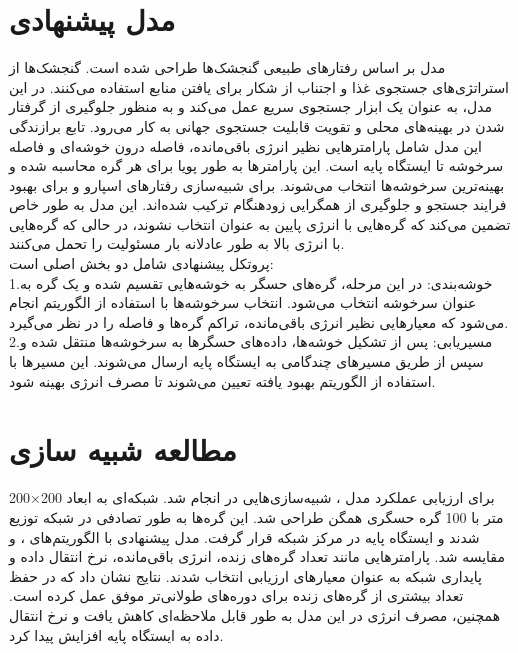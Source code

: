 \documentclass[11.5pt, onecolumn, a4paper]{article}
\begin{document}
\section{مدل پیشنهادی}
\hspace*{2em}مدل  بر اساس رفتارهای طبیعی  گنجشک‌ها طراحی شده است. گنجشک‌ها از استراتژی‌های جستجوی غذا و اجتناب از شکار برای یافتن منابع استفاده می‌کنند. در این مدل،  به عنوان یک ابزار جستجوی سریع عمل می‌کند و  به منظور جلوگیری از گرفتار شدن در بهینه‌های محلی و تقویت قابلیت جستجوی جهانی به کار می‌رود. تابع برازندگی این مدل شامل پارامترهایی نظیر انرژی باقی‌مانده، فاصله درون خوشه‌ای و فاصله سرخوشه تا ایستگاه پایه است. این پارامترها به طور پویا برای هر گره محاسبه شده و بهینه‌ترین سرخوشه‌ها انتخاب می‌شوند.  برای شبیه‌سازی رفتارهای اسپارو و  برای بهبود فرایند جستجو و جلوگیری از همگرایی زودهنگام ترکیب شده‌اند. این مدل به طور خاص تضمین می‌کند که گره‌هایی با انرژی پایین به عنوان  انتخاب نشوند، در حالی که گره‌هایی با انرژی بالا به طور عادلانه بار مسئولیت را تحمل می‌کنند.\\
پروتکل پیشنهادی شامل دو بخش اصلی است:\\
\hspace*{1em}1.خوشه‌بندی: در این مرحله، گره‌های حسگر به خوشه‌هایی تقسیم شده و یک گره به عنوان سرخوشه انتخاب می‌شود. انتخاب سرخوشه‌ها با استفاده از الگوریتم  انجام می‌شود که معیارهایی نظیر انرژی باقی‌مانده، تراکم گره‌ها و فاصله را در نظر می‌گیرد.\\
\hspace*{1em}2.مسیریابی: پس از تشکیل خوشه‌ها، داده‌های حسگرها به سرخوشه‌ها منتقل شده و سپس از طریق مسیرهای چندگامی به ایستگاه پایه ارسال می‌شوند. این مسیرها با استفاده از الگوریتم بهبود یافته  تعیین می‌شوند تا مصرف انرژی بهینه شود.


\section{مطالعه شبیه سازی}
\hspace*{1em}برای ارزیابی عملکرد مدل ، شبیه‌سازی‌هایی در    انجام شد. شبکه‌ای به ابعاد 200×200 متر با 100 گره حسگری همگن طراحی شد. این گره‌ها به طور تصادفی در شبکه توزیع شدند و ایستگاه پایه در مرکز شبکه قرار گرفت. مدل پیشنهادی با الگوریتم‌های ،  و  مقایسه شد. پارامترهایی مانند تعداد گره‌های زنده، انرژی باقی‌مانده، نرخ انتقال داده و پایداری شبکه به عنوان معیارهای ارزیابی انتخاب شدند. نتایج نشان داد که  در حفظ تعداد بیشتری از گره‌های زنده برای دوره‌های طولانی‌تر موفق عمل کرده است. همچنین، مصرف انرژی در این مدل به طور قابل ملاحظه‌ای کاهش یافت و نرخ انتقال داده به ایستگاه پایه افزایش پیدا کرد.\\	
\end{document}
